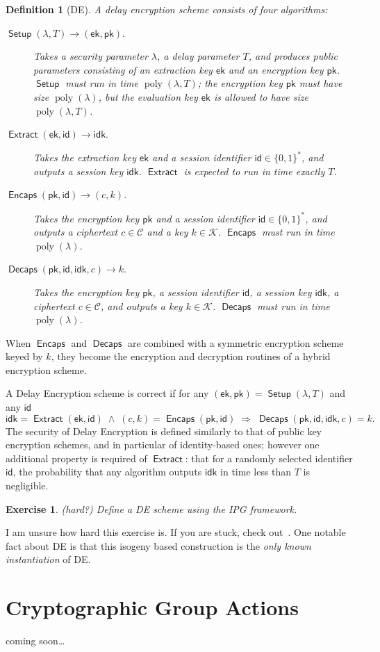 \documentclass{article}
\newtheorem{ex}{Exercise}
\newtheorem{defi}{Definition}
\newcommand{\ek}{\mathsf{ek}}
\newcommand{\pk}{\mathsf{pk}}
\newcommand{\id}{\mathsf{id}}
\newcommand{\idk}{\mathsf{idk}}
\DeclareMathOperator{\poly}{poly}
\DeclareMathOperator{\Setup}{\mathsf{Setup}}
\DeclareMathOperator{\Extract}{\mathsf{Extract}}
\DeclareMathOperator{\Encaps}{\mathsf{Encaps}}
\DeclareMathOperator{\Decaps}{\mathsf{Decaps}}
\newcommand{\keyspace}{\mathcal{K}}
\newcommand{\cipherspace}{\mathcal{C}}
\begin{document}
\begin{defi}[DE]
  A \emph{delay encryption} scheme consists of four algorithms:
  \begin{description}
  \item[$\Setup(\lambda, T) \to (\ek,\pk)$.] %
    Takes a \emph{security parameter} $\lambda$, a \emph{delay
      parameter} $T$, and produces public parameters consisting of an
    \emph{extraction key} $\ek$ and an \emph{encryption key} $\pk$. %
    $\Setup$ must run in time $\poly(\lambda,T)$; the encryption key
    $\pk$ must have size $\poly(\lambda)$, but the evaluation key $\ek$
    is allowed to have size $\poly(\lambda,T)$.
  \item[$\Extract(\ek,\id) \to \idk$.] %
    Takes the extraction key $\ek$ and a \emph{session identifier}
    $\id\in\{0,1\}^*$, and outputs a \emph{session key} $\idk$. %
    $\Extract$ is expected to run in time \emph{exactly} $T$.
  \item[$\Encaps(\pk,\id)\to (c,k)$.] %
    Takes the encryption key $\pk$ and a \emph{session identifier}
    $\id\in\{0,1\}^*$, and outputs a \emph{ciphertext}
    $c\in\cipherspace$ and a \emph{key} $k\in\keyspace$. %
    $\Encaps$ must run in time $\poly(\lambda)$.
  \item[$\Decaps(\pk,\id,\idk,c)\to k$.] %
    Takes the encryption key $\pk$, a \emph{session identifier}
    $\id$, a \emph{session key} $\idk$, a ciphertext $c\in\cipherspace$,
    and outputs a key $k\in\keyspace$. %
    $\Decaps$ must run in time $\poly(\lambda)$.
  \end{description}
\end{defi}

When $\Encaps$ and $\Decaps$ are combined with a symmetric encryption
scheme keyed by $k$, they become the encryption and decryption
routines of a hybrid encryption scheme.

A Delay Encryption scheme is correct if for any
$(\ek,\pk)=\Setup(\lambda,T)$ and any $\id$
\[\idk=\Extract(\ek,\id)
  \;\wedge\;
  (c,k) = \Encaps(\pk,\id)
  \;\Rightarrow\;
  \Decaps(\pk,\id,\idk,c) = k.\]
The security of Delay Encryption is defined similarly to that of
public key encryption schemes, and in particular of identity-based
ones; however one additional property is required of $\Extract$: that
for a randomly selected identifier $\id$, the probability that any
algorithm outputs $\idk$ in time less than $T$ is negligible. %


\begin{ex}(hard?)
  Define a DE scheme using the IPG framework.
\end{ex}

I am unsure how hard this exercise is.  If you are stuck, check
out~\cite[\S~3]{EPRINT:BurDeF20}.  One notable fact about DE is that this
isogeny based construction is the \emph{only known instantiation} of
DE.


\part{Cryptographic Group Actions}

coming soon\dots



\end{document}

